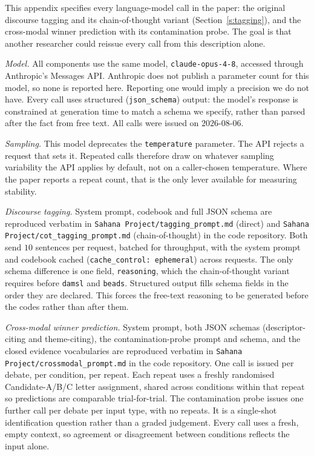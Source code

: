 \documentclass[pdflatex,sn-apa]{sn-jnl}%
\begin{document}
This appendix specifies every language-model call in the paper: the original
discourse tagging and its chain-of-thought variant (Section~\ref{s:tagging}),
and the cross-modal winner prediction with its contamination probe. The goal
is that another researcher could reissue every call from this description
alone.

\emph{Model.} All components use the same model, \texttt{claude-opus-4-8},
accessed through Anthropic's Messages API. Anthropic does not publish a
parameter count for this model, so none is reported here. Reporting one
would imply a precision we do not have. Every call uses structured
(\texttt{json\_schema}) output: the model's response is constrained at
generation time to match a schema we specify, rather than parsed after the
fact from free text. All calls were issued on $2026$-$08$-$06$.

\emph{Sampling.} This model deprecates the \texttt{temperature} parameter.
The API rejects a request that sets it. Repeated calls therefore draw on
whatever sampling variability the API applies by default, not on a
caller-chosen temperature. Where the paper reports a repeat count, that is
the only lever available for measuring stability.

\emph{Discourse tagging.} System prompt, codebook and full JSON schema are
reproduced verbatim in \texttt{Sahana Project/tagging\_prompt.md} (direct)
and \texttt{Sahana Project/cot\_tagging\_prompt.md} (chain-of-thought) in
the code repository. Both send $10$ sentences per request, batched for
throughput, with the system prompt and codebook cached
(\texttt{cache\_control: ephemeral}) across requests. The only schema
difference is one field, \texttt{reasoning}, which the chain-of-thought
variant requires before \texttt{damsl} and \texttt{beads}. Structured
output fills schema fields in the order they are declared. This forces the
free-text reasoning to be generated before the codes rather than after
them.

\emph{Cross-modal winner prediction.} System prompt, both JSON schemas
(descriptor-citing and theme-citing), the contamination-probe prompt and
schema, and the closed evidence vocabularies are reproduced verbatim in
\texttt{Sahana Project/crossmodal\_prompt.md} in the code repository. One
call is issued per debate, per condition, per repeat. Each repeat uses a
freshly randomised Candidate-A/B/C letter assignment, shared across
conditions within that repeat so predictions are comparable
trial-for-trial. The contamination probe issues one further call per
debate per input type, with no repeats. It is a single-shot identification
question rather than a graded judgement. Every call uses a fresh, empty
context, so agreement or disagreement between conditions reflects the
input alone.
\end{document}
